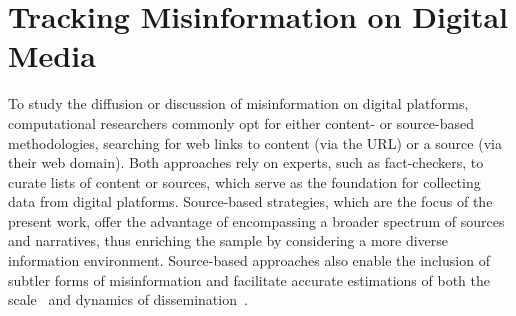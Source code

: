 \documentclass[12pt,twoside]{article}
\begin{document}
\section{Tracking Misinformation on Digital Media}
To study the diffusion or discussion of misinformation on digital platforms, computational researchers commonly opt for either content- or source-based methodologies, searching for web links to content (via the URL) or a source (via their web domain).
Both approaches rely on experts, such as fact-checkers, to curate lists of content or sources, which serve as the foundation for collecting data from digital platforms. 
Source-based strategies, which are the focus of the present work, offer the advantage of encompassing a broader spectrum of sources and narratives, thus enriching the sample by considering a more diverse information environment. 
Source-based approaches also enable the inclusion of subtler forms of misinformation and facilitate accurate estimations of both the scale~\citep{allenEvaluatingFakeNews2020, grinbergFakeNewsTwitter2019,guessExposureUntrustworthyWebsites2020a, yangCOVID19InfodemicTwitter2021a} and dynamics of dissemination~\citep{lasserSocialMediaSharing2022c, lasserAlternativeConceptionsHonesty2023, guessCrackingOpenNews2021, robertsonUsersChooseEngage2023a, shaoSpreadLowcredibilityContent2018}. 
\end{document}
